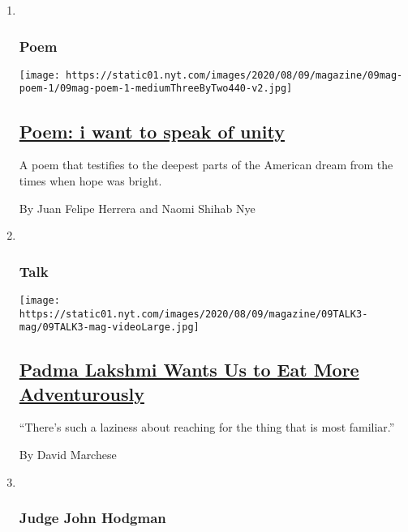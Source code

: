 \begin{enumerate}
\def\labelenumi{\arabic{enumi}.}
\item ~
  \hypertarget{poem}{%
  \subsubsection{Poem}\label{poem}}

  \texttt{[image: https://static01.nyt.com/images/2020/08/09/magazine/09mag-poem-1/09mag-poem-1-mediumThreeByTwo440-v2.jpg]}

  \hypertarget{poem-i-want-to-speak-of-unity}{%
  \subsection{\texorpdfstring{\href{/2020/08/06/magazine/poem-i-want-to-speak-of-unity.html}{Poem:
  i want to speak of
  unity}}{Poem: i want to speak of unity}}\label{poem-i-want-to-speak-of-unity}}

  A poem that testifies to the deepest parts of the American dream from
  the times when hope was bright.

  By Juan Felipe Herrera and Naomi Shihab Nye
\item ~
  \hypertarget{talk}{%
  \subsubsection{Talk}\label{talk}}

  \texttt{[image: https://static01.nyt.com/images/2020/08/09/magazine/09TALK3-mag/09TALK3-mag-videoLarge.jpg]}

  \hypertarget{padma-lakshmi-wants-us-to-eat-more-adventurously}{%
  \subsection{\texorpdfstring{\href{/interactive/2020/08/03/magazine/padma-lakshmi-interview.html}{Padma
  Lakshmi Wants Us to Eat More
  Adventurously}}{Padma Lakshmi Wants Us to Eat More Adventurously}}\label{padma-lakshmi-wants-us-to-eat-more-adventurously}}

  ``There's such a laziness about reaching for the thing that is most
  familiar.''

  By David Marchese
\item ~
  \hypertarget{judge-john-hodgman}{%
  \subsubsection{Judge John Hodgman}\label{judge-john-hodgman}}


\end{enumerate}
